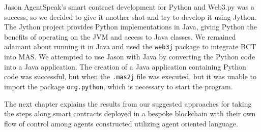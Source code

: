 \vspace{.5cm}

Jason AgentSpeak's smart contract development for Python and Web3.py was a success, so we decided to give it another shot and try to develop it using Jython. The Jython project provides Python implementations in Java, giving Python the benefits of operating on the JVM and access to Java classes. We remained adamant about running it in Java and used the \texttt{web3j} package to integrate \ac{BCT} into \ac{MAS}. We attempted to use Jason with Java by converting the Python code into a Java application. The creation of a Java application containing Python code was successful, but when the \texttt{.mas2j} file was executed, but it was unable to import the package \texttt{org.python}, which is necessary to start the program.

\vspace{.5cm}

The next chapter explains the results from our suggested approaches for taking the steps along smart contracts deployed in a bespoke blockchain with their own flow of control among agents constructed utilizing agent oriented language.

